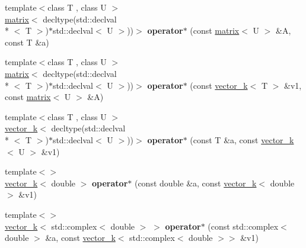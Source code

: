 \begin{DoxyCompactItemize}
\item 
\hypertarget{namespacekeycpp_ae187563f8f86e256bc1394edcba1b2b1}{{\footnotesize template$<$class T , class U $>$ }\\\hyperlink{classkeycpp_1_1matrix}{matrix}$<$ decltype(std\-::declval\\*
$<$ T $>$)$\ast$std\-::declval$<$ U $>$))$>$ {\bfseries operator$\ast$} (const \hyperlink{classkeycpp_1_1matrix}{matrix}$<$ U $>$ \&A, const T \&a)}\label{namespacekeycpp_ae187563f8f86e256bc1394edcba1b2b1}

\item 
\hypertarget{namespacekeycpp_a7a43db361f4a3128d89ad6a1db86686c}{{\footnotesize template$<$class T , class U $>$ }\\\hyperlink{classkeycpp_1_1matrix}{matrix}$<$ decltype(std\-::declval\\*
$<$ T $>$)$\ast$std\-::declval$<$ U $>$))$>$ {\bfseries operator$\ast$} (const \hyperlink{classkeycpp_1_1vector__k}{vector\-\_\-k}$<$ T $>$ \&v1, const \hyperlink{classkeycpp_1_1matrix}{matrix}$<$ U $>$ \&A)}\label{namespacekeycpp_a7a43db361f4a3128d89ad6a1db86686c}

\item 
\hypertarget{namespacekeycpp_a6e4d2d791a5cbcbcf90de5da2250b4c8}{{\footnotesize template$<$class T , class U $>$ }\\\hyperlink{classkeycpp_1_1vector__k}{vector\-\_\-k}$<$ decltype(std\-::declval\\*
$<$ T $>$)$\ast$std\-::declval$<$ U $>$))$>$ {\bfseries operator$\ast$} (const T \&a, const \hyperlink{classkeycpp_1_1vector__k}{vector\-\_\-k}$<$ U $>$ \&v1)}\label{namespacekeycpp_a6e4d2d791a5cbcbcf90de5da2250b4c8}

\item 
\hypertarget{namespacekeycpp_ac7a042d0e04e0c610b5798017c8196d9}{{\footnotesize template$<$$>$ }\\\hyperlink{classkeycpp_1_1vector__k}{vector\-\_\-k}$<$ double $>$ {\bfseries operator$\ast$} (const double \&a, const \hyperlink{classkeycpp_1_1vector__k}{vector\-\_\-k}$<$ double $>$ \&v1)}\label{namespacekeycpp_ac7a042d0e04e0c610b5798017c8196d9}

\item 
\hypertarget{namespacekeycpp_a06de45116e1111f3aca66cd18565e9ba}{{\footnotesize template$<$$>$ }\\\hyperlink{classkeycpp_1_1vector__k}{vector\-\_\-k}$<$ std\-::complex$<$ double $>$ $>$ {\bfseries operator$\ast$} (const std\-::complex$<$ double $>$ \&a, const \hyperlink{classkeycpp_1_1vector__k}{vector\-\_\-k}$<$ std\-::complex$<$ double $>$$>$ \&v1)}\label{namespacekeycpp_a06de45116e1111f3aca66cd18565e9ba}


\end{DoxyCompactItemize}
